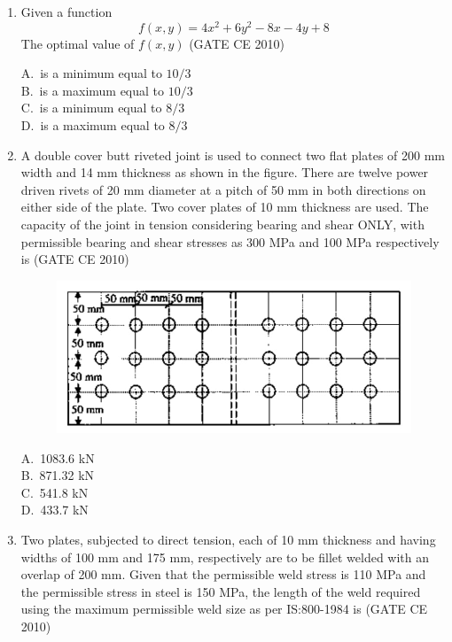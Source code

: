 \documentclass[journal,12pt,onecolumn]{exam}
\theoremstyle{remark}
\begin{document}
\begin{enumerate}
\noindent\item Given a function 
\[
f(x, y) = 4x^2 + 6y^2 - 8x - 4y + 8
\]
The optimal value of $f(x, y)$
\hfill{(GATE CE 2010)}
\begin{multicols}{4}
A.\ is a minimum equal to $10/3$ \\
B.\ is a maximum equal to $10/3$ \\
C.\ is a minimum equal to $8/3$ \\
D.\ is a maximum equal to $8/3$
\end{multicols}

\noindent\item A double cover butt riveted joint is used to connect two flat plates of 200 mm width and 14 mm thickness as shown in the figure. There are twelve power driven rivets of 20 mm diameter at a pitch of 50 mm in both directions on either side of the plate. Two cover plates of 10 mm thickness are used. The capacity of the joint in tension considering bearing and shear ONLY, with permissible bearing and shear stresses as 300 MPa and 100 MPa respectively is
\hfill{(GATE CE 2010)}

\begin{figure}[H]
     \centering
     \includegraphics[scale=0.5]{figs/8332fb3c-532c-4d6c-a8c4-1f20c3321f4f.jpg} 
     \caption{}
     \label{fig:figure3}
 \end{figure}

\begin{multicols}{4}
A.\ 1083.6 kN \\
B.\ 871.32 kN \\
C.\ 541.8 kN \\
D.\ 433.7 kN
\end{multicols}

\noindent\item Two plates, subjected to direct tension, each of 10 mm thickness and having widths of 100 mm and 175 mm, respectively are to be fillet welded with an overlap of 200 mm. Given that the permissible weld stress is 110 MPa and the permissible stress in steel is 150 MPa, the length of the weld required using the maximum permissible weld size as per IS:800-1984 is
\hfill{(GATE CE 2010)}


\end{enumerate}
\end{document}
